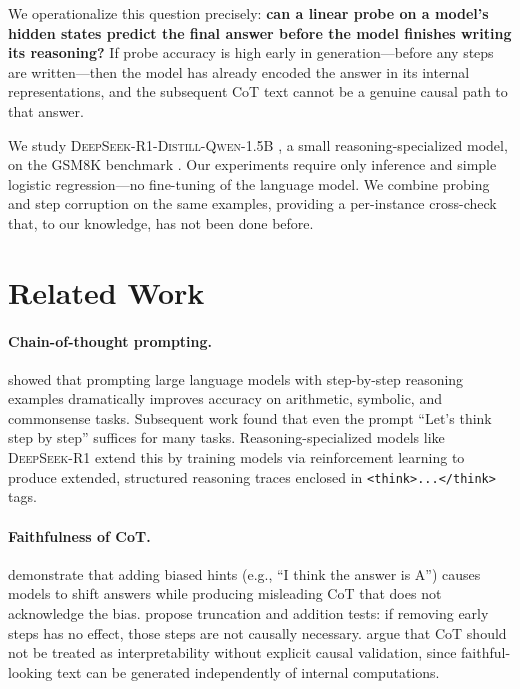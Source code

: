 \documentclass[11pt]{article}
\begin{document}
We operationalize this question precisely: \textbf{can a linear probe on a model's hidden states predict the final answer before the model finishes writing its reasoning?} If probe accuracy is high early in generation—before any steps are written—then the model has already encoded the answer in its internal representations, and the subsequent CoT text cannot be a genuine causal path to that answer.

We study \textsc{DeepSeek-R1-Distill-Qwen-1.5B} \cite{deepseek2025r1}, a small reasoning-specialized model, on the GSM8K benchmark \cite{cobbe2021training}. Our experiments require only inference and simple logistic regression—no fine-tuning of the language model. We combine probing and step corruption on the same examples, providing a per-instance cross-check that, to our knowledge, has not been done before.

\section{Related Work}

\paragraph{Chain-of-thought prompting.}
\citet{wei2022chain} showed that prompting large language models with step-by-step reasoning examples dramatically improves accuracy on arithmetic, symbolic, and commonsense tasks. Subsequent work \cite{kojima2022large} found that even the prompt ``Let's think step by step'' suffices for many tasks. Reasoning-specialized models like \textsc{DeepSeek-R1} \cite{deepseek2025r1} extend this by training models via reinforcement learning to produce extended, structured reasoning traces enclosed in \texttt{<think>...</think>} tags.

\paragraph{Faithfulness of CoT.}
\citet{turpin2024language} demonstrate that adding biased hints (e.g., ``I think the answer is A'') causes models to shift answers while producing misleading CoT that does not acknowledge the bias. \citet{lanham2023measuring} propose truncation and addition tests: if removing early steps has no effect, those steps are not causally necessary. \citet{barez2025chain} argue that CoT should not be treated as interpretability without explicit causal validation, since faithful-looking text can be generated independently of internal computations.
\end{document}
